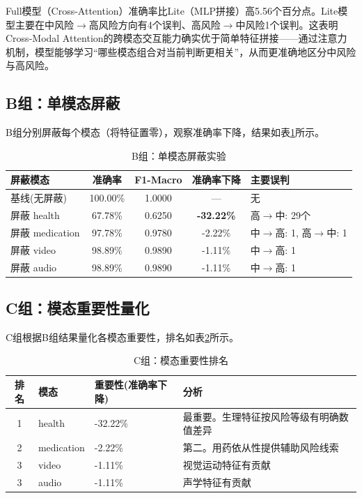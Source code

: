 Full模型（Cross-Attention）准确率比Lite（MLP拼接）高5.56个百分点。Lite模型主要在中风险$\to$高风险方向有4个误判、高风险$\to$中风险1个误判。这表明Cross-Modal Attention的跨模态交互能力确实优于简单特征拼接——通过注意力机制，模型能够学习``哪些模态组合对当前判断更相关''，从而更准确地区分中风险与高风险。

\subsection{B组：单模态屏蔽}

B组分别屏蔽每个模态（将特征置零），观察准确率下降，结果如表\ref{tab:ablation_b}所示。

\begin{table}[H]
\centering
\caption{B组：单模态屏蔽实验}
\label{tab:ablation_b}
\begin{tabular}{lcccl}
\toprule
屏蔽模态 & 准确率 & F1-Macro & 准确率下降 & 主要误判 \\
\midrule
基线(无屏蔽) & 100.00\% & 1.0000 & --- & 无 \\
屏蔽 health & 67.78\% & 0.6250 & \textbf{-32.22\%} & 高$\to$中: 29个 \\
屏蔽 medication & 97.78\% & 0.9780 & -2.22\% & 中$\to$高: 1, 高$\to$中: 1 \\
屏蔽 video & 98.89\% & 0.9890 & -1.11\% & 中$\to$高: 1 \\
屏蔽 audio & 98.89\% & 0.9890 & -1.11\% & 中$\to$高: 1 \\
\bottomrule
\end{tabular}
\end{table}

\subsection{C组：模态重要性量化}

C组根据B组结果量化各模态重要性，排名如表\ref{tab:ablation_c}所示。

\begin{table}[H]
\centering
\caption{C组：模态重要性排名}
\label{tab:ablation_c}
\begin{tabular}{clll}
\toprule
排名 & 模态 & 重要性(准确率下降) & 分析 \\
\midrule
1 & health & -32.22\% & 最重要。生理特征按风险等级有明确数值差异 \\
2 & medication & -2.22\% & 第二。用药依从性提供辅助风险线索 \\
3 & video & -1.11\% & 视觉运动特征有贡献 \\
3 & audio & -1.11\% & 声学特征有贡献 \\
\bottomrule
\end{tabular}
\end{table}

